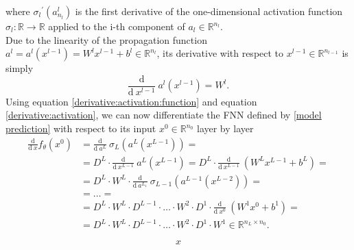 where ${\sigma_{l}}^{\prime} \left( a^{l}_{n_l} \right)$ is the first derivative of the one-dimensional activation function $\sigma_{l} \colon \mathbb{R} \to \mathbb{R}$ applied to the i-th component of $a_l \in \mathbb{R}^{n_l}$. \\
Due to the linearity of the propagation function $a^l = a^l\left(x^{l-1}\right) = W^{l} x^{l-1} + b^{l} \in \mathbb{R}^{n_l}$, its derivative with respect to $x^{l-1} \in \mathbb{R}^{n_{l-1}}$ is simply
\begin{equation}
    \label{derivative:activation}
    \frac{\mathrm{d}}{\mathrm{d} \ x^{l-1}} \ a^{l}\left(x^{l-1}\right) = W^l.
\end{equation}
Using equation \cref{derivative:activation:function} and equation \cref{derivative:activation}, we can now differentiate the FNN defined by \cref{model prediction} with respect to its input $x^0 \in \mathbb{R}^{n_0}$ layer by layer 
\begin{align*}
    \frac{\mathrm{d}}{\mathrm{d} \ x} f_{\theta}\left(x^0\right) & = \frac{\mathrm{d}}{\mathrm{d} \ a^{L}} \ \sigma_{L} \left(a^{L}\left(x^{L-1}\right)\right) = \\
    & = D^L \cdot \frac{\mathrm{d}}{\mathrm{d} \ x^{L-1}} \ a^{L}\left(x^{L-1}\right) = D^L \cdot \frac{\mathrm{d}}{\mathrm{d} \ x^{L-1}} \ \left(W^{L} x^{L-1} + b^{L}\right) = \\
    & = D^L \cdot W^L \cdot \frac{\mathrm{d}}{\mathrm{d} \ a^{L_1}} \ \sigma_{L-1} \left(a^{L-1}\left(x^{L-2}\right)\right) = \\
    & = \ldots = \\
    & = D^L \cdot W^L \cdot D^{L-1} \cdot \ldots \cdot W^2 \cdot D^1 \cdot \frac{\mathrm{d}}{\mathrm{d} \ x^{0}} \ \left(W^{1} x^{0} + b^{1}\right) = \\
    & = D^L \cdot W^L \cdot D^{L-1} \cdot \ldots \cdot W^2 \cdot D^1 \cdot W^{1} \in \mathbb{R}^{n_L \times n_0}.
\end{align*}


\begin{equation*}
    x
\end{equation*}

